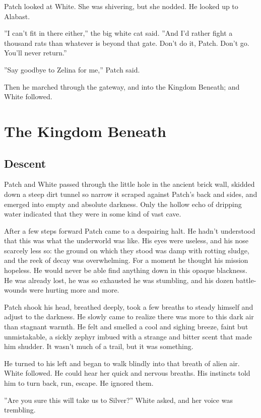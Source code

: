 \documentclass[12pt]{book}
\begin{document}
Patch looked at White. She was shivering, but she nodded. He looked up
to Alabast.

''I can't fit in there either,'' the big white cat said. ''And I'd
rather fight a thousand rats than whatever is beyond that gate. Don't
do it, Patch. Don't go. You'll never return.''

''Say goodbye to Zelina for me,'' Patch said.

Then he marched through the gateway, and into the Kingdom Beneath; and
White followed.


\chapter{The Kingdom Beneath}

\section{Descent}

Patch and White passed through the little hole in the ancient brick
wall, skidded down a steep dirt tunnel so narrow it scraped against
Patch's back and sides, and emerged into empty and absolute
darkness. Only the hollow echo of dripping water indicated that they
were in some kind of vast cave.

After a few steps forward Patch came to a despairing halt. He hadn't
understood that this was what the underworld was like. His eyes were
useless, and his nose scarcely less so: the ground on which they stood
was damp with rotting sludge, and the reek of decay was
overwhelming. For a moment he thought his mission hopeless. He would
never be able find anything down in this opaque blackness. He was
already lost, he was so exhausted he was stumbling, and his dozen
battle-wounds were hurting more and more.

Patch shook his head, breathed deeply, took a few breaths to steady
himself and adjust to the darkness. He slowly came to realize there
was more to this dark air than stagnant warmth. He felt and smelled a
cool and sighing breeze, faint but unmistakable, a sickly zephyr
imbued with a strange and bitter scent that made him shudder. It
wasn't much of a trail, but it was something.

He turned to his left and began to walk blindly into that breath of
alien air. White followed. He could hear her quick and nervous
breaths. His instincts told him to turn back, run, escape. He ignored
them.

''Are you sure this will take us to Silver?'' White asked, and her
voice was trembling.
\end{document}
